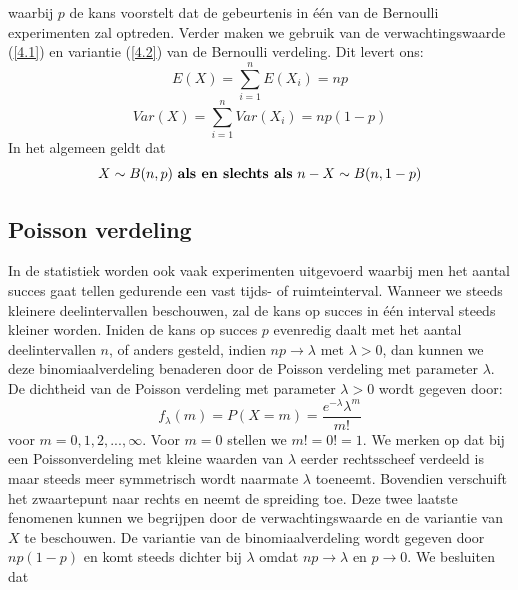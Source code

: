 \documentclass[titlepage]{article}
\numberwithin{equation}{section}
\begin{document}
 waarbij $p$ de kans voorstelt dat de gebeurtenis in één van de Bernoulli experimenten zal optreden.\newline
 Verder maken we gebruik van de verwachtingswaarde (\ref{4.1}) en variantie (\ref{4.2}) van de Bernoulli verdeling. Dit levert ons:
 \begin{equation}
 	E(X)=\sum\limits_{i=1}^n E(X_i) = np
 	\label{4.4}
 \end{equation}
 \begin{equation}
 	Var(X) = \sum\limits_{i=1}^n Var(X_i)=np(1-p)
 	\label{4.5}
 \end{equation}
 In het algemeen geldt dat
 \begin{equation*}
 	X\sim B(n,p) \text{ \textbf{als en slechts als} } n-X \sim B(n,1-p)
 \end{equation*}
 \subsection{Poisson verdeling}
 In de statistiek worden ook vaak experimenten uitgevoerd waarbij men het aantal succes gaat tellen gedurende een vast tijds- of ruimteinterval. Wanneer we steeds kleinere deelintervallen beschouwen, zal de kans op succes in één interval steeds kleiner worden. Iniden de kans op succes $p$ evenredig daalt met het aantal deelintervallen $n$, of anders gesteld, indien $np \rightarrow \lambda$ met $\lambda>0$, dan kunnen we deze binomiaalverdeling benaderen door de Poisson verdeling met parameter $\lambda$.\newline\newline
 De dichtheid van de Poisson verdeling met parameter $\lambda>0$ wordt gegeven door:
 \begin{equation}
 	f_\lambda(m) = P(X=m) = \frac{e^{-\lambda}\lambda^m}{m!}
 	\label{4.6}
 \end{equation}
 voor $m = 0, 1, 2, ... , \infty$. Voor $m= 0$ stellen we $m!=0!=1$.\newline\newline
 We merken op dat bij een Poissonverdeling met kleine waarden van $\lambda$ eerder rechtsscheef verdeeld is maar steeds meer symmetrisch wordt naarmate $\lambda$ toeneemt. Bovendien verschuift het zwaartepunt naar rechts en neemt de spreiding toe. Deze twee laatste fenomenen kunnen we begrijpen  door de verwachtingswaarde en de variantie van $X$ te beschouwen.\newline
 De variantie van de binomiaalverdeling wordt gegeven door $np(1-p)$ en komt steeds dichter bij $\lambda$ omdat $np \rightarrow \lambda$ en $p \rightarrow 0$. We besluiten dat
\end{document}
